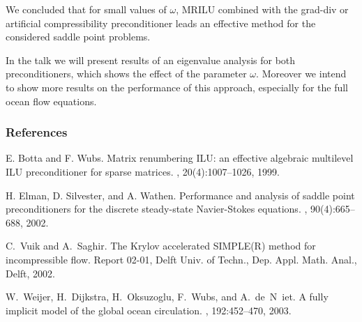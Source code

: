 \documentclass{report}
\begin{document}
We concluded that for small values of $\omega$, MRILU combined
with the grad-div or artificial compressibility preconditioner
leads an effective method for the considered saddle point
problems.

In the talk we will present results of an eigenvalue analysis for
both preconditioners, which shows the effect of the parameter
$\omega$. Moreover we intend to show more results on the
performance of this approach, especially for the full ocean flow
equations.

\subsubsection*{References}
{\small

\noindent
[1] E. Botta and F. Wubs.
\newblock Matrix renumbering {I}{L}{U}: an effective algebraic multilevel
{I}{L}{U} preconditioner for sparse matrices.
, 20(4):1007--1026,
1999.

\noindent
[2] H. Elman, D. Silvester, and A. Wathen.
\newblock Performance and analysis of saddle point preconditioners for the
discrete steady-state {N}avier-{S}tokes equations.
, 90(4):665--688, 2002.

\noindent
[3] C.~Vuik and A.~Saghir.
\newblock The {K}rylov accelerated {SIMPLE(R)} method for incompressible flow.
\newblock Report 02-01, Delft Univ. of Techn., Dep. Appl. Math. Anal., Delft, 2002.

\noindent
[4] W.~Weijer, H.~Dijkstra, H.~Oksuzoglu, F.~Wubs, and
A.~de~N~iet.
\newblock A fully implicit model of the global ocean circulation.
, 192:452--470, 2003.

}
\end{document}
